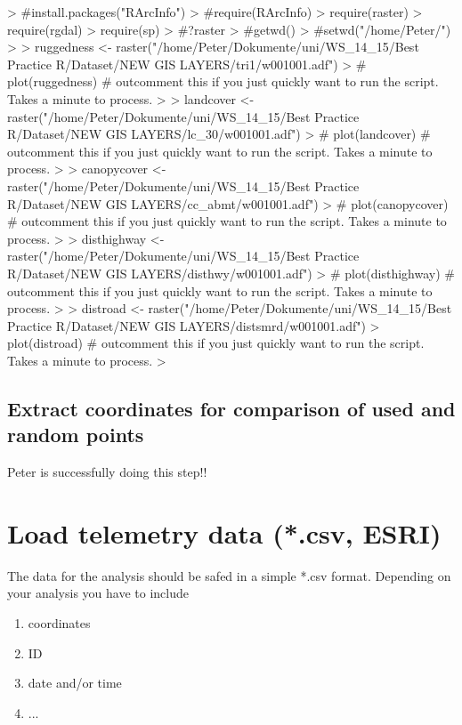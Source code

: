 \documentclass[11pt, a4paper]{article} %
\begin{document}
\begin{Schunk}
\begin{Sinput}
> #install.packages("RArcInfo")
> #require(RArcInfo)
> require(raster)
> require(rgdal)
> require(sp)
> #?raster
> #getwd()
> #setwd("/home/Peter/")
> 
> ruggedness <- raster("/home/Peter/Dokumente/uni/WS_14_15/Best Practice R/Dataset/NEW GIS LAYERS/tri1/w001001.adf") 
> # plot(ruggedness) # outcomment this if you just quickly want to run the script. Takes a minute to process.
> 
> landcover <- raster("/home/Peter/Dokumente/uni/WS_14_15/Best Practice R/Dataset/NEW GIS LAYERS/lc_30/w001001.adf") 
> # plot(landcover) # outcomment this if you just quickly want to run the script. Takes a minute to process.
> 
> canopycover <- raster("/home/Peter/Dokumente/uni/WS_14_15/Best Practice R/Dataset/NEW GIS LAYERS/cc_abmt/w001001.adf") 
> # plot(canopycover) # outcomment this if you just quickly want to run the script. Takes a minute to process.
> 
> disthighway <- raster("/home/Peter/Dokumente/uni/WS_14_15/Best Practice R/Dataset/NEW GIS LAYERS/disthwy/w001001.adf") 
> # plot(disthighway) # outcomment this if you just quickly want to run the script. Takes a minute to process.
> 
> distroad <- raster("/home/Peter/Dokumente/uni/WS_14_15/Best Practice R/Dataset/NEW GIS LAYERS/distsmrd/w001001.adf") 
> plot(distroad) # outcomment this if you just quickly want to run the script. Takes a minute to process.
> 
\end{Sinput}
\end{Schunk}


\subsection{Extract coordinates for comparison of used and random points} %
Peter is successfully doing this step!!

\section{Load telemetry data (*.csv, ESRI)}%
The data for the analysis should be safed in a simple *.csv format. Depending on your analysis you have to include 
\begin{enumerate}
\item{coordinates}
\item{ID}
\item{date and/or time}
\item{...}
\end{enumerate}
\end{document}
